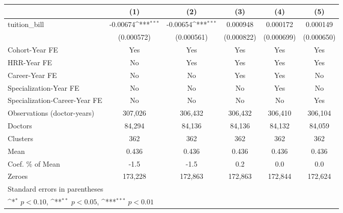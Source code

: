 {
\def\sym#1{\ifmmode^{#1}\else\(^{#1}\)\fi}
\begin{tabular}{l*{5}{c}}
\hline\hline
                    &\multicolumn{1}{c}{(1)}         &\multicolumn{1}{c}{(2)}         &\multicolumn{1}{c}{(3)}         &\multicolumn{1}{c}{(4)}         &\multicolumn{1}{c}{(5)}         \\
\hline
tuition\_bill        &    -0.00674\sym{***}&    -0.00654\sym{***}&    0.000948         &    0.000172         &    0.000149         \\
                    &  (0.000572)         &  (0.000561)         &  (0.000822)         &  (0.000699)         &  (0.000650)         \\
[1em]
Cohort-Year FE      &         Yes         &         Yes         &         Yes         &         Yes         &         Yes         \\
[1em]
HRR-Year FE         &          No         &         Yes         &         Yes         &         Yes         &         Yes         \\
[1em]
Career-Year FE      &          No         &          No         &         Yes         &         Yes         &          No         \\
[1em]
Specialization-Year FE&          No         &          No         &          No         &         Yes         &          No         \\
[1em]
Specialization-Career-Year FE&          No         &          No         &          No         &          No         &         Yes         \\
\hline
Observations (doctor-years)&     307,026         &     306,432         &     306,432         &     306,410         &     306,104         \\
Doctors             &      84,294         &      84,136         &      84,136         &      84,132         &      84,059         \\
Clusters            &         362         &         362         &         362         &         362         &         362         \\
Mean                &       0.436         &       0.436         &       0.436         &       0.436         &       0.436         \\
Coef. \% of Mean    &        -1.5         &        -1.5         &         0.2         &         0.0         &         0.0         \\
Zeroes              &     173,228         &     172,863         &     172,863         &     172,844         &     172,624         \\
\hline\hline
\multicolumn{6}{l}{\footnotesize Standard errors in parentheses}\\
\multicolumn{6}{l}{\footnotesize \sym{*} \(p<0.10\), \sym{**} \(p<0.05\), \sym{***} \(p<0.01\)}\\
\end{tabular}
}
